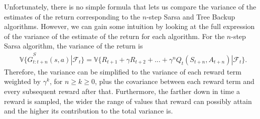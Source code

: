 Unfortunately, there is no simple formula that lets us compare the variance of the estimates of the return corresponding to the $n$-step Sarsa and Tree Backup algorithms.
However, we can gain some intuition by looking at the full expression of the variance of the estimate of the return for each algorithm.
For the $n$-step Sarsa algorithm, the variance of the return is
\begin{align}
\label{eq:sarsa_variance}
    & \mathbb{V}\{ \hat{G}^S_{t:t+n}(s, a) | \mathcal{F}_t \} = 
        \mathbb{V}\{ R_{t+1} + \gamma R_{t+2} + ... + \gamma^n Q_t(S_{t+n}, A_{t+n}) | \mathcal{F}_t \}.
\end{align}
Therefore, the variance can be simplified to the variance of each reward term weighted by $\gamma^k$, for $n \geq k \geq 0$, plus the covariance between each reward term and every subsequent reward after that.
Furthermore, the farther down in time a reward is sampled, the wider the range of values that reward can possibly attain and the higher its contribution to the total variance is.

